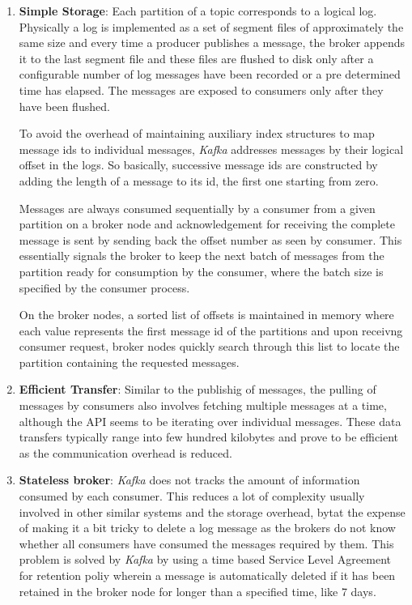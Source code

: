 \documentclass[12pt, a4paper]{article}
\begin{document}
\begin{enumerate}
    \item \textbf{Simple Storage}: Each partition of a topic corresponds to a logical log. Physically a log is implemented as a set of segment files of approximately the same size and every time a producer publishes a message, the broker appends it to the last segment file and these files are flushed to disk only after a configurable number of log messages have been recorded or a pre determined time has elapsed. The messages are exposed to consumers only after they have been flushed.\par

    To avoid the overhead of maintaining auxiliary index structures to map message ids to individual messages, \textit{Kafka} addresses messages by their logical offset in the logs. So basically, successive message ids are constructed by adding the length of a message to its id, the first one starting from zero.\par

    Messages are always consumed sequentially by a consumer from a given partition on a broker node and acknowledgement for receiving the complete message is sent by sending back the offset number as seen by consumer. This essentially signals the broker to keep the next batch of messages from the partition ready for consumption by the consumer, where the batch size is specified by the consumer process.\par

    On the broker nodes, a sorted list of offsets is maintained in memory where each value represents the first message id of the partitions and upon receivng consumer request, broker nodes quickly search through this list to locate the partition containing the requested messages.\par

    \item \textbf{Efficient Transfer}: Similar to the publishig of messages, the pulling of messages by consumers also involves fetching multiple messages at a time, although the API seems to be iterating over individual messages. These data transfers typically range into few hundred kilobytes and prove to be efficient as the communication overhead is reduced.

    \item \textbf{Stateless broker}: \textit{Kafka} does not tracks the amount of information consumed by each consumer. This reduces a lot of complexity usually involved in other similar systems and the storage overhead, bytat the expense of making it a bit tricky to delete a log message as the brokers do not know whether all consumers have consumed the messages required by them. This problem is solved by \textit{Kafka} by using a time based Service Level Agreement for retention poliy wherein a message is automatically deleted if it has been retained in the broker node for longer than a specified time, like 7 days.
\end{enumerate}
\end{document}
